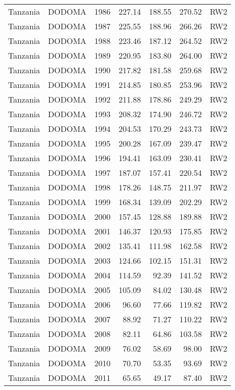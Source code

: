 \begin{longtable}{lllrrrl}
  Tanzania & DODOMA & 1986 & 227.14 & 188.55 & 270.52 & RW2 \\ 
  Tanzania & DODOMA & 1987 & 225.55 & 188.96 & 266.26 & RW2 \\ 
  Tanzania & DODOMA & 1988 & 223.46 & 187.12 & 264.52 & RW2 \\ 
  Tanzania & DODOMA & 1989 & 220.95 & 183.80 & 264.00 & RW2 \\ 
  Tanzania & DODOMA & 1990 & 217.82 & 181.58 & 259.68 & RW2 \\ 
  Tanzania & DODOMA & 1991 & 214.85 & 180.85 & 253.96 & RW2 \\ 
  Tanzania & DODOMA & 1992 & 211.88 & 178.86 & 249.29 & RW2 \\ 
  Tanzania & DODOMA & 1993 & 208.32 & 174.90 & 246.72 & RW2 \\ 
  Tanzania & DODOMA & 1994 & 204.53 & 170.29 & 243.73 & RW2 \\ 
  Tanzania & DODOMA & 1995 & 200.28 & 167.09 & 239.47 & RW2 \\ 
  Tanzania & DODOMA & 1996 & 194.41 & 163.09 & 230.41 & RW2 \\ 
  Tanzania & DODOMA & 1997 & 187.07 & 157.41 & 220.54 & RW2 \\ 
  Tanzania & DODOMA & 1998 & 178.26 & 148.75 & 211.97 & RW2 \\ 
  Tanzania & DODOMA & 1999 & 168.34 & 139.09 & 202.29 & RW2 \\ 
  Tanzania & DODOMA & 2000 & 157.45 & 128.88 & 189.88 & RW2 \\ 
  Tanzania & DODOMA & 2001 & 146.37 & 120.93 & 175.85 & RW2 \\ 
  Tanzania & DODOMA & 2002 & 135.41 & 111.98 & 162.58 & RW2 \\ 
  Tanzania & DODOMA & 2003 & 124.66 & 102.15 & 151.31 & RW2 \\ 
  Tanzania & DODOMA & 2004 & 114.59 & 92.39 & 141.52 & RW2 \\ 
  Tanzania & DODOMA & 2005 & 105.09 & 84.02 & 130.48 & RW2 \\ 
  Tanzania & DODOMA & 2006 & 96.60 & 77.66 & 119.82 & RW2 \\ 
  Tanzania & DODOMA & 2007 & 88.92 & 71.27 & 110.22 & RW2 \\ 
  Tanzania & DODOMA & 2008 & 82.11 & 64.86 & 103.58 & RW2 \\ 
  Tanzania & DODOMA & 2009 & 76.02 & 58.69 & 98.00 & RW2 \\ 
  Tanzania & DODOMA & 2010 & 70.70 & 53.35 & 93.69 & RW2 \\ 
  Tanzania & DODOMA & 2011 & 65.65 & 49.17 & 87.40 & RW2 \\ 

\end{longtable}
